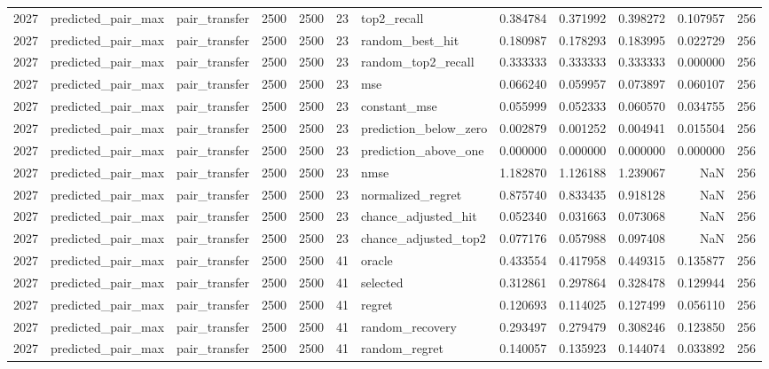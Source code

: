 \begin{tabular}{rllrrrlrrrrr}
2027 & predicted_pair_max & pair_transfer & 2500 & 2500 & 23 & top2_recall & 0.384784 & 0.371992 & 0.398272 & 0.107957 & 256 \\
2027 & predicted_pair_max & pair_transfer & 2500 & 2500 & 23 & random_best_hit & 0.180987 & 0.178293 & 0.183995 & 0.022729 & 256 \\
2027 & predicted_pair_max & pair_transfer & 2500 & 2500 & 23 & random_top2_recall & 0.333333 & 0.333333 & 0.333333 & 0.000000 & 256 \\
2027 & predicted_pair_max & pair_transfer & 2500 & 2500 & 23 & mse & 0.066240 & 0.059957 & 0.073897 & 0.060107 & 256 \\
2027 & predicted_pair_max & pair_transfer & 2500 & 2500 & 23 & constant_mse & 0.055999 & 0.052333 & 0.060570 & 0.034755 & 256 \\
2027 & predicted_pair_max & pair_transfer & 2500 & 2500 & 23 & prediction_below_zero & 0.002879 & 0.001252 & 0.004941 & 0.015504 & 256 \\
2027 & predicted_pair_max & pair_transfer & 2500 & 2500 & 23 & prediction_above_one & 0.000000 & 0.000000 & 0.000000 & 0.000000 & 256 \\
2027 & predicted_pair_max & pair_transfer & 2500 & 2500 & 23 & nmse & 1.182870 & 1.126188 & 1.239067 & NaN & 256 \\
2027 & predicted_pair_max & pair_transfer & 2500 & 2500 & 23 & normalized_regret & 0.875740 & 0.833435 & 0.918128 & NaN & 256 \\
2027 & predicted_pair_max & pair_transfer & 2500 & 2500 & 23 & chance_adjusted_hit & 0.052340 & 0.031663 & 0.073068 & NaN & 256 \\
2027 & predicted_pair_max & pair_transfer & 2500 & 2500 & 23 & chance_adjusted_top2 & 0.077176 & 0.057988 & 0.097408 & NaN & 256 \\
2027 & predicted_pair_max & pair_transfer & 2500 & 2500 & 41 & oracle & 0.433554 & 0.417958 & 0.449315 & 0.135877 & 256 \\
2027 & predicted_pair_max & pair_transfer & 2500 & 2500 & 41 & selected & 0.312861 & 0.297864 & 0.328478 & 0.129944 & 256 \\
2027 & predicted_pair_max & pair_transfer & 2500 & 2500 & 41 & regret & 0.120693 & 0.114025 & 0.127499 & 0.056110 & 256 \\
2027 & predicted_pair_max & pair_transfer & 2500 & 2500 & 41 & random_recovery & 0.293497 & 0.279479 & 0.308246 & 0.123850 & 256 \\
2027 & predicted_pair_max & pair_transfer & 2500 & 2500 & 41 & random_regret & 0.140057 & 0.135923 & 0.144074 & 0.033892 & 256 \\

\end{tabular}
